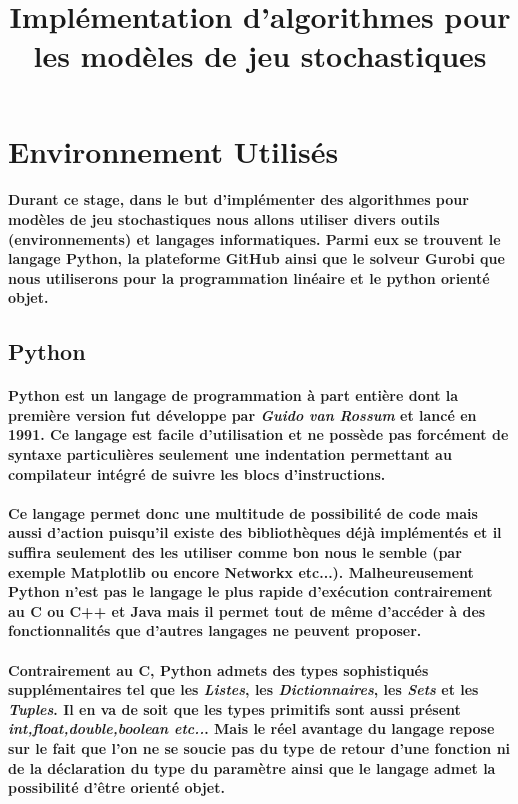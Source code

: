 \documentclass[a4paper, 12pt, twoside]{article}
\title{Implémentation d'algorithmes pour les modèles de jeu stochastiques}
\begin{document}
\pagedegarde

\newpage

\tableofcontents
\newpage

\section{Environnement Utilisés}
\paragraph{Durant ce stage, dans le but d'implémenter des algorithmes pour modèles de jeu stochastiques nous allons utiliser divers outils (environnements) et langages informatiques. Parmi eux se trouvent le langage Python, la plateforme GitHub ainsi que le solveur Gurobi que nous utiliserons pour la programmation linéaire et le python orienté objet.}
\subsection{Python}
\paragraph{Python est un langage de programmation à part entière dont la première version fut développe par \textit{Guido van Rossum} et lancé en 1991. Ce langage est facile d'utilisation et ne possède pas forcément de syntaxe particulières seulement une indentation   permettant au compilateur intégré de suivre les blocs d'instructions.}
\paragraph{Ce langage permet donc une multitude de possibilité de code mais aussi d'action puisqu'il existe des bibliothèques déjà implémentés et il suffira seulement des les utiliser comme bon nous le semble (par exemple Matplotlib ou encore Networkx etc...). Malheureusement Python n'est pas le langage le plus rapide d'exécution contrairement au C ou C++ et Java mais il permet tout de même d'accéder à des fonctionnalités que d'autres langages ne peuvent proposer.}
\paragraph{Contrairement au C, Python admets des types sophistiqués supplémentaires tel que les \textit{Listes}, les \textit{Dictionnaires}, les \textit{Sets} et les \textit{Tuples}. Il en va de soit que les types primitifs sont aussi présent \textit{int,float,double,boolean etc..}. Mais le réel avantage du langage repose sur le fait que l'on ne se soucie pas du type de retour d'une fonction ni de la déclaration du type du paramètre ainsi que le langage admet la possibilité d'être orienté objet.}
\end{document}
